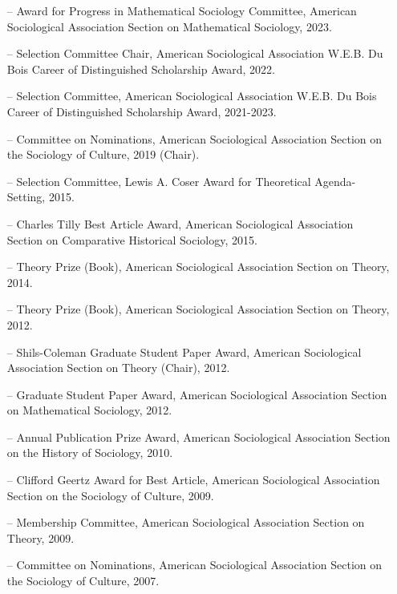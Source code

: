 \begin{itemize}[itemsep=-0.5ex] 
    \item[--] Award for Progress in Mathematical Sociology Committee, American Sociological Association Section on Mathematical Sociology, 2023.
    \item[--] Selection Committee Chair, American Sociological Association W.E.B. Du Bois Career of Distinguished Scholarship Award, 2022.
    \item[--] Selection Committee, American Sociological Association W.E.B. Du Bois Career of Distinguished Scholarship Award, 2021-2023.
    \item[--] Committee on Nominations, American Sociological Association Section on the Sociology of Culture, 2019 (Chair).
    \item[--] Selection Committee, Lewis A. Coser Award for Theoretical Agenda-Setting, 2015.
    \item[--] Charles Tilly Best Article Award, American Sociological Association Section on Comparative Historical Sociology, 2015.
    
    \item[--] Theory Prize (Book), American Sociological Association Section on Theory, 2014.
    
    \item[--] Theory Prize (Book), American Sociological Association Section on Theory, 2012.
    
    \item[--] Shils-Coleman Graduate Student Paper Award, American Sociological Association Section on Theory (Chair), 2012.
    
    \item[--] Graduate Student Paper Award, American Sociological Association Section on Mathematical Sociology, 2012.
    
    \item[--] Annual Publication Prize Award, American Sociological Association Section on the History of Sociology, 2010.
    
    \item[--] Clifford Geertz Award for Best Article, American Sociological Association Section on the Sociology of Culture, 2009.
    
    \item[--] Membership Committee, American Sociological Association Section on Theory, 2009.
    
    \item[--] Committee on Nominations, American Sociological Association Section on the Sociology of Culture, 2007.
\end{itemize}